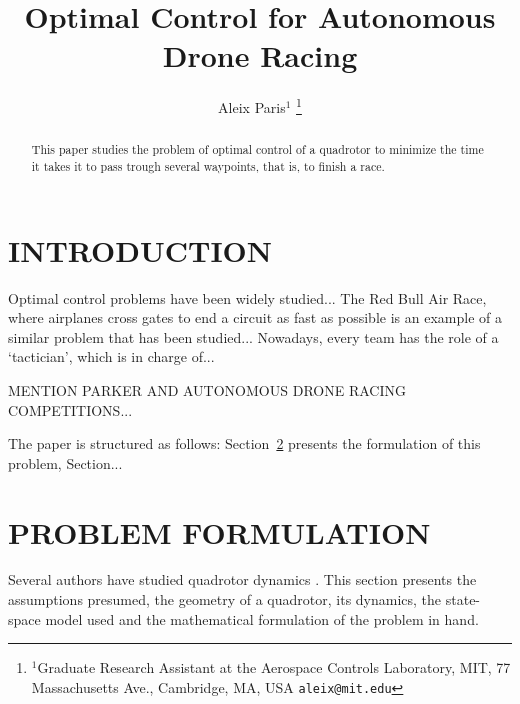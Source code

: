 \documentclass[letterpaper, 10 pt, conference]{ieeeconf}  %
\title{\LARGE \bf
Optimal Control for Autonomous Drone Racing
}
\author{Aleix Paris$^{1}$%
\thanks{$^{1}$Graduate Research Assistant at the Aerospace Controls Laboratory,
        MIT, 77 Massachusetts Ave., Cambridge, MA, USA
        {\tt\small aleix@mit.edu}}%
}
\begin{document}
\maketitle
\thispagestyle{empty}
\pagestyle{empty}


\begin{abstract}

This paper studies the problem of optimal control of a quadrotor to minimize the time it takes it to pass trough several waypoints, that is, to finish a race.

\end{abstract}


\section{INTRODUCTION}\label{s:intro}

Optimal control problems have been widely studied...
The Red Bull Air Race, where airplanes cross gates to end a circuit as fast as possible is an example of a similar problem that has been studied... Nowadays, every team has the role of a `tactician', which is in charge of...

MENTION PARKER AND AUTONOMOUS DRONE RACING COMPETITIONS...

The paper is structured as follows: Section~\ref{s:problem} presents the formulation of this problem, Section...


\section{PROBLEM FORMULATION}\label{s:problem}

Several authors have studied quadrotor dynamics \cite{IEEEexample:article_typical}. %
This section presents the assumptions presumed, the geometry of a quadrotor, its dynamics, the state-space model used and the mathematical formulation of the problem in hand.
\end{document}
